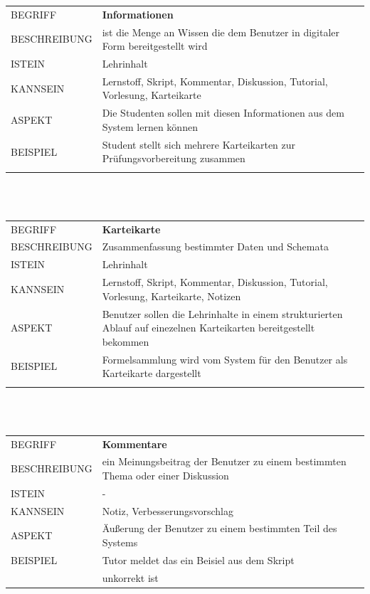 \documentclass[12pt,a4paper]{article}
\begin{document}
\begin{tabular}{l p{12cm}}
	BEGRIFF 	 & \textbf{Informationen} \\ 
	BESCHREIBUNG & ist die Menge an Wissen die dem Benutzer in digitaler Form bereitgestellt wird\\ 
	ISTEIN   	 & Lehrinhalt\\
	KANNSEIN 	 & Lernstoff, Skript, Kommentar, Diskussion, Tutorial, Vorlesung, Karteikarte\\ 
	ASPEKT   	 & Die Studenten sollen mit diesen Informationen aus dem System lernen können\\
	BEISPIEL 	 & Student stellt sich mehrere Karteikarten zur Prüfungsvorbereitung zusammen\\\\
	\hline
\end{tabular}\\\\  

\begin{tabular}{l p{12cm}}
	BEGRIFF 	 & \textbf{Karteikarte} \\ 
	BESCHREIBUNG & Zusammenfassung bestimmter Daten und Schemata\\ 
	ISTEIN   	 & Lehrinhalt\\
	KANNSEIN 	 & Lernstoff, Skript, Kommentar, Diskussion, Tutorial, Vorlesung, Karteikarte, Notizen\\ 
	ASPEKT   	 & Benutzer sollen die Lehrinhalte in einem strukturierten Ablauf auf einezelnen Karteikarten bereitgestellt bekommen\\
	BEISPIEL 	 & Formelsammlung wird vom System für den Benutzer als Karteikarte 			   dargestellt\\\\
	\hline
\end{tabular}\\\\  

\begin{tabular}{l p{12cm}}
	BEGRIFF 	 & \textbf{Kommentare} \\ 
	BESCHREIBUNG & ein Meinungsbeitrag der Benutzer zu einem bestimmten Thema oder einer Diskussion\\ 
	ISTEIN   	 & -\\
	KANNSEIN 	 & Notiz, Verbesserungsvorschlag\\ 
	ASPEKT   	 & Äußerung der Benutzer zu einem bestimmten Teil des Systems\\
	BEISPIEL 	 & Tutor meldet das ein Beisiel aus dem Skript\\
	& unkorrekt ist\\
	\hline
\end{tabular}\\\\  
\end{document}
